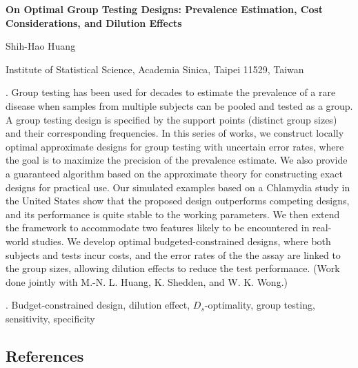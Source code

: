 \documentclass[12pt]{article}
\begin{document}
\begin{flushleft}


{\LARGE\bf On Optimal Group Testing Designs: Prevalence Estimation, Cost Considerations, and Dilution Effects}


\vspace{1.0cm}

Shih-Hao Huang

\begin{description}

\item Institute of Statistical Science, Academia Sinica,
Taipei 11529, Taiwan

\end{description}

\end{flushleft}


\vspace{0.75cm}

. 
Group testing has been used for decades to estimate the prevalence of a rare disease when samples from multiple subjects can be pooled and tested as a group. A group testing design is specified by the support points (distinct group sizes) and their corresponding frequencies. In this series of works, we construct locally optimal approximate designs for group testing with uncertain error rates, where the goal is to maximize the precision of the prevalence estimate. We also provide a guaranteed algorithm based on the approximate theory for constructing exact designs for practical use. Our simulated examples based on a Chlamydia study in the United States show that the proposed design outperforms competing designs, and its performance is quite stable to the working parameters. We then extend the framework to accommodate two features likely to be encountered in real-world studies. We develop optimal budgeted-constrained designs, where both subjects and tests incur costs, and the error rates of the the assay are linked to the group sizes, allowing dilution effects to reduce the test performance.
(Work done jointly with M.-N. L. Huang, K. Shedden, and W. K. Wong.)

\vskip 2mm

.
Budget-constrained design, dilution effect, $D_s$-optimality, group testing, sensitivity, specificity


\subsection*{References}
\end{document}
